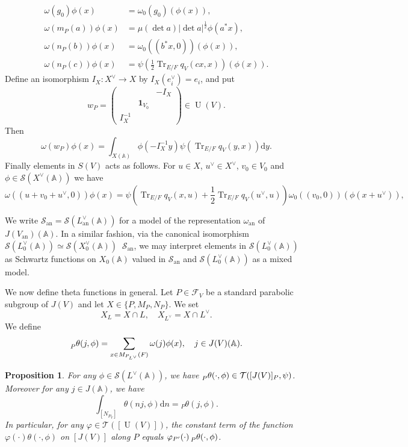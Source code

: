 \documentclass[letterpaper,11pt]{amsart}
\newcommand{\bA}{\mathbb{A}}
\newcommand{\cF}{\mathcal{F}}
\newcommand{\cS}{\mathcal{S}}
\newcommand{\cT}{\mathcal{T}}
\newcommand{\rd}{\mathrm{d}}
\newcommand{\<}{\negthickspace}
\providecommand{\abs}[1]{\lvert#1\rvert}
\DeclareMathOperator{\Tr}{Tr}
\DeclareMathOperator{\U}{U}
\DeclareMathOperator{\id}{\mathbf{1}}
\DeclareMathOperator{\otimeshat}{\widehat{\otimes}}
\theoremstyle{definition}
\theoremstyle{plain}
\newtheorem{prop}[definition]{Proposition}
\theoremstyle{remark}
\numberwithin{equation}{section}
\begin{document}
    \begin{align}
    \omega(g_0)\phi(x) &= \omega_0(g_0)(\phi(x)) \label{eq:weil_formula_P1},\\
    \omega(m_P(a)) \phi(x) & = \mu(\det a) \abs{\det a}^{\frac{1}{2}}
    \phi(a^* x) \label{eq:weil_formula_P2},\\
    \omega(n_P(b))\phi(x) &= \omega_0((b^* x, 0)) (\phi(x)) \label{eq:weil_formula_P3} ,\\
    \omega(n_P(c))\phi(x) & = \psi(\frac{1}{2} \Tr_{E/F} q_V(cx, x)) (\phi(x)) \label{eq:weil_formula_P4}.
    \end{align}
Define an isomorphism $I_X: X^\vee \to X$ by $I_X(e_i^\vee) = e_i$, and put
    \[
    w_P = \begin{pmatrix} && -I_X \\ & \id_{V_0} \\ I_X^{-1} \end{pmatrix}
    \in \U(V).
    \]
Then
    \begin{equation}    \label{eq:weil_formula_weyl}
    \omega(w_P)\phi (x) = \int_{X(\bA)} \phi(-I_X^{-1} y)
    \psi(\Tr_{E/F}q_V(y, x)) \rd y.
    \end{equation}
Finally elements in $S(V)$ acts as follows. For $u \in X$, $u^\vee \in
X^\vee$, $v_0 \in V_0$ and $\phi \in \cS(X^\vee(\bA))$ we have
    \begin{equation}\label{eq:weil_formula_Heisenberg}
    \omega((u + v_0 + u^\vee, 0)) \phi(x) =
    \psi(\Tr_{E/F} q_V(x, u) + \frac{1}{2} \Tr_{E/F} q_V(u^\vee, u))
    \omega_0 ( (v_0, 0)) (\phi(x+u^\vee)),
    \end{equation}

We write $\cS_{\mathrm{an}} =
\cS(L_{\mathrm{an}}^\vee(\bA))$ for a model of the representation
$\omega_{\mathrm{an}}$ of $J(V_{\mathrm{an}})(\bA)$.
In a similar fashion, via the canonical isomorphism
$\cS(L_0^\vee(\bA)) \simeq \cS(X_0^\vee(\bA)) \otimeshat \cS_{\mathrm{an}}$,
we may interpret elements in $\cS(L_0^\vee(\bA))$ as Schwartz functions on $X_0(\bA)$
valued in $\cS_{\mathrm{an}}$ and $\cS(L_0^\vee(\bA))$ as a mixed model.

We now define theta functions in general. Let $P \in \cF_V$ be a standard parabolic
subgroup of $J(V)$ and let $X \in \{ P,M_P,N_P \}$. We set
 \[
 X_{L} = X \cap L, \quad X_{L^\vee} = X \cap L^\vee.
 \]
 We define
    \[
    \prescript{}{P}{\theta(j, \phi)} =
    \sum_{x \in M_{P_{L^\vee}}(F)}
    \omega(j)\phi(x), \quad
    j \in J(V)(\bA).
    \]

\begin{prop} \label{prop:u_theta_property}
For any $\phi \in \cS(L^\vee(\bA))$, we have
$\prescript{}{P}{\theta}(\cdot,\phi) \in \cT([J(V)]_{P},\psi)$. Moreover
for any $j \in J(\bA)$, we have
        \[
        \int_{[N_{P_V}]} \theta(nj,\phi) \rd n = {}_P \theta(j,\phi).
        \]
In particular, for any $\varphi \in \cT([\U(V)])$, the constant
term of the function $\varphi(\cdot) \theta(\cdot, \phi)$ on $[J(V)]$
along $P$ equals $\varphi_{P'}(\cdot) \prescript{}{P}{\theta}(\cdot, \phi)$.
\end{prop}
\end{document}
